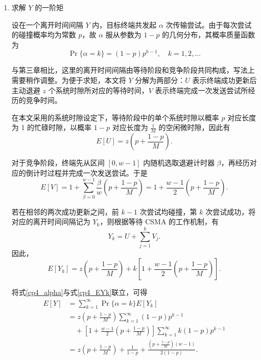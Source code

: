 \begin{enumerate}[wide]
    \item 求解 $Y$ 的一阶矩

    设在一个离开时间间隔 $Y$ 内，目标终端共发起 $\alpha$ 次传输尝试。由于每次尝试的碰撞概率均为常数 $p$，故 $\alpha$ 服从参数为 $1-p$ 的几何分布，其概率质量函数为
    \begin{equation}\label{cp4_alpha}
        \Pr\{\alpha=k\}=(1-p)p^{k-1}, \quad k=1,2,\dots
    \end{equation}

    与第三章相比，这里的离开时间间隔由等待阶段和竞争阶段共同构成，写法上需要稍作调整。为便于求矩，本文将 $Y$ 分解为两部分：$U$ 表示终端成功更新后主动退避 $z$ 个系统时隙所对应的等待时间，$V$ 表示终端完成一次发送尝试所经历的竞争时间。

    在本文采用的系统时隙设定下，等待阶段中的单个系统时隙以概率 $p$ 对应长度为 1 的忙碌时隙，以概率 $1-p$ 对应长度为 $\frac{1}{M}$ 的空闲微时隙，因此有
    \begin{equation}\label{cp4_EU}
        E[U] = z\left(p+\frac{1-p}{M}\right).
    \end{equation}

    对于竞争阶段，终端先从区间 $[0,w-1]$ 内随机选取退避计时器 $\beta$，再经历对应的倒计时过程并完成一次发送尝试。于是
    \begin{equation}\label{cp4_EV}
        E[V] = 1 + \sum_{\beta=0}^{w-1}\frac{\beta}{w}\left(p+\frac{1-p}{M}\right)
        = 1+\frac{w-1}{2}\left(p+\frac{1-p}{M}\right).
    \end{equation}

    若在相邻的两次成功更新之间，前 $k-1$ 次尝试均碰撞，第 $k$ 次尝试成功，将对应的离开时间间隔记为 $Y_k$，则根据等待 CSMA 的工作机制，有
    \begin{equation}\label{cp4_Yk_expression}
        Y_k = U+\sum_{j=1}^{k}V_j.
    \end{equation}
    因此，
    \begin{equation}\label{cp4_EYk}
        E[Y_k] = z \left( p + \frac{1-p}{M} \right) + k \left[ 1 + \frac{w-1}{2} \left( p + \frac{1-p}{M} \right) \right].
    \end{equation}

    将式\eqref{cp4_alpha}与式\eqref{cp4_EYk}联立，可得
    \begin{equation}\label{cp4_EY}
        \begin{aligned}
        E[Y] &= \sum_{k=1}^{\infty} \Pr\{\alpha = k\} E[Y_k] \\
        &= z \left( p + \frac{1-p}{M} \right) \sum_{k=1}^{\infty} (1-p) p^{k-1} \\
        &\quad + \left[ 1 + \frac{w-1}{2} \left( p + \frac{1-p}{M} \right) \right] \sum_{k=1}^{\infty} k (1-p) p^{k-1} \\
        &= z \left( p + \frac{1-p}{M} \right) + \frac{1}{1-p} + \frac{\left( p + \frac{1-p}{M} \right) (w-1)}{2(1-p)}.
        \end{aligned}
    \end{equation}


\end{enumerate}
